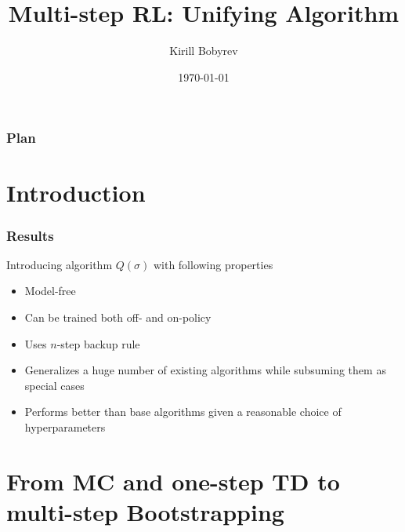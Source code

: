 \documentclass{beamer}
\title{Multi-step RL: Unifying Algorithm}
\author{Kirill Bobyrev}
\date{\today}
\begin{document}
\begin{frame}
  \titlepage
\end{frame}

\begin{frame}
  \frametitle{Plan}
  \tableofcontents
\end{frame}


\section{Introduction}

\begin{frame}
  \frametitle{Results}
  Introducing algorithm $Q(\sigma)$ with following properties
  \begin{itemize}
    \item Model-free
    \item Can be trained both off- and on-policy
    \item Uses $n$-step backup rule
    \item Generalizes a huge number of existing algorithms while subsuming them
      as special cases
    \item Performs better than base algorithms given a reasonable choice of
      hyperparameters
  \end{itemize}
\end{frame}

\section{From MC and one-step TD to multi-step Bootstrapping}
\end{document}
